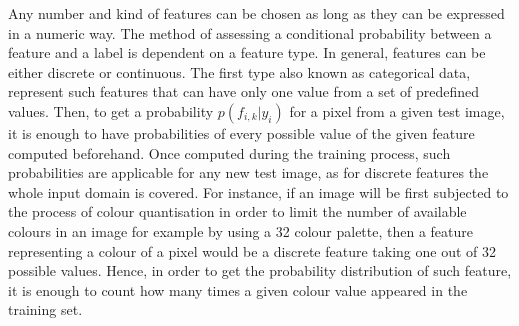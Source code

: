 Any number and kind of features can be chosen as long as they can be expressed in a numeric way. The method of assessing a conditional probability between a feature and a label is dependent on a feature type. In general, features can be either discrete or continuous. The first type also known as categorical data, represent such features that can have only one value from a set of predefined values. Then, to get a probability $p(f_{i,k}|y_i)$ for a pixel from a given test image, it is enough to have probabilities of every possible value of the given feature computed beforehand. Once computed during the training process, such probabilities are applicable for any new test image, as for discrete features the whole input domain is covered. For instance, if an image will be first subjected to the process of colour quantisation in order to limit the number of available colours in an image for example by using a 32 colour palette, then a feature representing a colour of a pixel would be a discrete feature taking one out of 32 possible values. Hence, in order to get the probability distribution of such feature, it is enough to count how many times a given colour value appeared in the training set.

